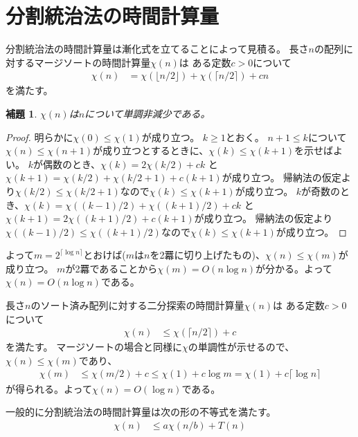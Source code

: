 \documentclass[a4paper,twoside,onecolumn,openany,article,10pt]{memoir}
\newtheorem{lemma}{補題}
\theoremstyle{remark}
\begin{document}
\section{分割統治法の時間計算量}
分割統治法の時間計算量は漸化式を立てることによって見積る。
長さ$n$の配列に対するマージソートの時間計算量$\chi(n)$は
ある定数$c>0$について
\begin{align*}
\chi(n) &= \chi(\lfloor n/2\rfloor) + \chi(\lceil n/2\rceil) + c n
\end{align*}
を満たす。
\begin{lemma}
$\chi(n)$は$n$について単調非減少である。
\end{lemma}
\begin{proof}
明らかに$\chi(0)\le\chi(1)$が成り立つ。
$k\ge 1$とおく。
$n+1\le k$について$\chi(n)\le\chi(n+1)$が成り立つとするときに、$\chi(k)\le\chi(k+1)$を示せばよい。
$k$が偶数のとき、$\chi(k) = 2\chi(k/2) + c k$ と $\chi(k+1) = \chi(k/2) + \chi(k/2+1) + c(k+1)$が成り立つ。
帰納法の仮定より$\chi(k/2)\le\chi(k/2+1)$なので$\chi(k)\le\chi(k+1)$が成り立つ。
$k$が奇数のとき、$\chi(k) = \chi((k-1)/2) + \chi((k+1)/2) + c k$ と $\chi(k+1) = 2\chi((k+1)/2) + c(k+1)$が成り立つ。
帰納法の仮定より$\chi((k-1)/2)\le\chi((k+1)/2)$なので$\chi(k)\le\chi(k+1)$が成り立つ。
\end{proof}
よって$m=2^{\lceil \log n\rceil}$とおけば($m$は$n$を2羃に切り上げたもの)、$\chi(n)\le\chi(m)$が成り立つ。
$m$が2羃であることから$\chi(m)=O(n\log n)$が分かる。よって$\chi(n)=O(n\log n)$である。

長さ$n$のソート済み配列に対する二分探索の時間計算量$\chi(n)$は
ある定数$c>0$について
\begin{align*}
\chi(n) &\le \chi(\lceil n/2\rceil) + c
\end{align*}
を満たす。
マージソートの場合と同様に$\chi$の単調性が示せるので、$\chi(n)\le \chi(m)$であり、
\begin{align*}
\chi(m) &\le \chi(m/2) + c
\le \chi(1) + c \log m = \chi(1) + c \lceil \log n\rceil
\end{align*}
が得られる。よって$\chi(n)=O(\log n)$である。

一般的に分割統治法の時間計算量は次の形の不等式を満たす。
\begin{align*}
\chi(n) &\le a \chi(n/b) + T(n)
\end{align*}
\end{document}
